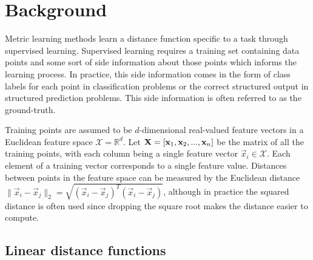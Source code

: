 \section{Background}











Metric learning methods learn a distance function specific to a task through supervised learning. Supervised learning requires a training set containing data points and some sort of side information about those points which informs the learning process. In practice, this side information comes in the form of class labels for each point in classification problems or the correct structured output in structured prediction problems. This side information is often referred to as the ground-truth.

Training points are assumed to be $d$-dimensional real-valued feature vectors in a Euclidean feature space $\mathcal{X} = \mathbb{R}^d$. Let $\mathbf{X} = \left[ \mathbf{x}_1, \mathbf{x}_2, ..., \mathbf{x}_n \right]$ be the matrix of all the training points, with each column being a single feature vector $\vec{x}_i \in \mathcal{X}$. Each element of a training vector corresponds to a single feature value. Distances between points in the feature space can be measured by the Euclidean distance $\|\vec{x}_i - \vec{x}_j\|_2 = \sqrt{(\vec{x}_i - \vec{x}_j)^T(\vec{x}_i - \vec{x}_j)}$, although in practice the squared distance is often used since dropping the square root makes the distance easier to compute.



\subsection{Linear distance functions}

